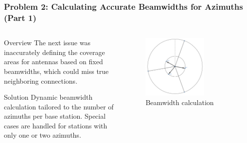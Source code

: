 \begin{frame}
    \frametitle{Problem 2: Calculating Accurate Beamwidths for Azimuths (Part 1)}
    \begin{columns}
        \begin{column}{0.5\textwidth}
    \begin{block}{Overview}
        The next issue was inaccurately defining the coverage areas for antennas based on fixed beamwidths, which could miss true neighboring connections.
    \end{block}
    \begin{block}{Solution}
        Dynamic beamwidth calculation tailored to the number of azimuths per base station. Special cases are handled for stations with only one or two azimuths.
    \end{block}
        \end{column}
        \begin{column}{0.5\textwidth}
            \begin{figure}
                \includegraphics[width=0.7\textwidth]{images/Altair/az_beamwidth_calc.png}  
                \caption{Beamwidth calculation}
            \end{figure}
        \end{column}
    \end{columns}
\end{frame}

